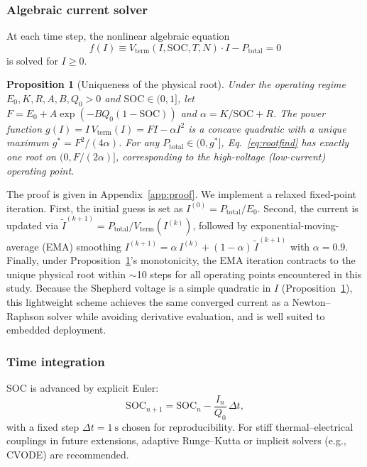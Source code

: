 \documentclass[5p,times,number]{elsarticle}
\newcommand{\appref}[1]{\textcolor{supercolor}{Appendix~\ref{#1}}}
\newcommand{\eqnref}[1]{\textcolor{supercolor}{Eq.~\eqref{#1}}}
\newtheorem{proposition}{Proposition}
\begin{document}
\subsubsection{Algebraic current solver}
At each time step, the nonlinear algebraic equation
\begin{equation}\label{eq:rootfind}
f(I) \equiv V_{\mathrm{term}}(I, \mathrm{SOC}, T, N) \cdot I - P_{\mathrm{total}} = 0
\end{equation}
is solved for $I \ge 0$.
\begin{proposition}[Uniqueness of the physical root]\label{prop:mono}
Under the operating regime $E_0, K, R, A, B, Q_0 > 0$ and $\mathrm{SOC} \in (0, 1]$, let $F = E_0 + A\exp(-BQ_0(1-\mathrm{SOC}))$ and $\alpha = K/\mathrm{SOC} + R$.
The power function $g(I) = I\,V_{\mathrm{term}}(I) = FI - \alpha I^2$ is a concave quadratic with a unique maximum $g^* = F^2/(4\alpha)$.
For any $P_{\mathrm{total}} \in (0, g^*]$, \eqnref{eq:rootfind} has exactly one root on $(0, F/(2\alpha)]$, corresponding to the high-voltage (low-current) operating point.
\end{proposition}
The proof is given in \appref{app:proof}.
We implement a relaxed fixed-point iteration.
First, the initial guess is set as $I^{(0)} = P_{\mathrm{total}}/E_0$.
Second, the current is updated via $\tilde{I}^{(k+1)} = P_{\mathrm{total}} / V_{\mathrm{term}}(I^{(k)})$, followed by exponential-moving-average (EMA) smoothing $I^{(k+1)} = \alpha\, I^{(k)} + (1-\alpha)\,\tilde{I}^{(k+1)}$ with $\alpha = 0.9$.
Finally, under Proposition~\ref{prop:mono}'s monotonicity, the EMA iteration contracts to the unique physical root within $\sim$10 steps for all operating points encountered in this study.
Because the Shepherd voltage is a simple quadratic in $I$ (Proposition~\ref{prop:mono}), this lightweight scheme achieves the same converged current as a Newton--Raphson solver while avoiding derivative evaluation, and is well suited to embedded deployment.

\subsubsection{Time integration}
SOC is advanced by explicit Euler:
\begin{equation}
\mathrm{SOC}_{n+1} = \mathrm{SOC}_n - \frac{I_n}{Q_0}\,\Delta t,
\end{equation}
with a fixed step $\Delta t = \SI{1}{\second}$ chosen for reproducibility.
For stiff thermal--electrical couplings in future extensions, adaptive Runge--Kutta or implicit solvers (e.g., CVODE) are recommended.
\end{document}
